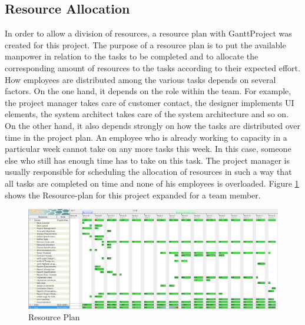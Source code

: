 \subsection{Resource Allocation}
In order to allow a division of resources, a resource plan with GanttProject was created for this project. The purpose of a resource plan is to put the available manpower in relation to the tasks to be completed and to allocate the corresponding amount of resources to the tasks according to their expected effort. How employees are distributed among the various tasks depends on several factors. On the one hand, it depends on the role within the team. For example, the project manager takes care of customer contact, the designer implements UI elements, the system architect takes care of the system architecture and so on. On the other hand, it also depends strongly on how the tasks are distributed over time in the project plan. An employee who is already working to capacity in a particular week cannot take on any more tasks this week. In this case, someone else who still has enough time has to take on this task. The project manager is usually responsible for scheduling the allocation of resources in such a way that all tasks are completed on time and none of his employees is overloaded. Figure \ref{resource-plan} shows the Resource-plan for this project expanded for a team member.
\begin{landscape}
	\thispagestyle{plain}
	\begin{figure}[H]
		\centering
		\includegraphics[width =1.4\textwidth]{images/Resourcenplan.PNG}
		\caption{Resource Plan}
		\label{resource-plan}
	\end{figure}
\end{landscape}
